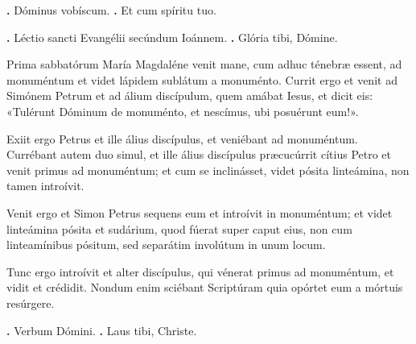 
\textbf{\Vbar.} Dóminus vobíscum.
\textbf{\Rbar.} Et cum spíritu tuo.

\textbf{\Vbar.} Léctio sancti Evangélii secúndum Ioánnem.
\textbf{\Rbar.} Glória tibi, Dómine.

Prima sabbatórum María Magdaléne venit mane, cum adhuc ténebræ essent, ad monuméntum et videt lápidem sublátum a monuménto. 
Currit ergo et venit ad Simónem Petrum et ad álium discípulum, quem amábat Iesus, et dicit eis: «Tulérunt Dóminum de monuménto, et nescímus, ubi posuérunt eum!».

Exiit ergo Petrus et ille álius discípulus, et veniébant ad monuméntum.
Currébant autem duo simul, et ille álius discípulus præcucúrrit cítius Petro et venit primus ad monuméntum; et cum se inclinásset, videt pósita linteámina, non tamen introívit.

Venit ergo et Simon Petrus sequens eum et introívit in monuméntum; et videt linteámina pósita et sudárium, quod fúerat super caput eius, non cum linteamínibus pósitum, sed separátim involútum in unum locum.

Tunc ergo introívit et alter discípulus, qui vénerat primus ad monuméntum, et vidit et crédidit. 
Nondum enim sciébant Scriptúram quia opórtet eum a mórtuis resúrgere.

\textbf{\Vbar.} Verbum Dómini.
\textbf{\Rbar.} Laus tibi, Christe.
\par